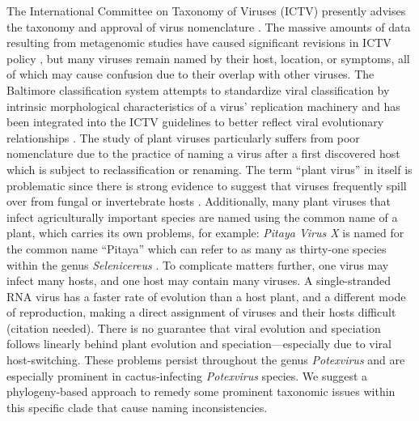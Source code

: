 \documentclass[11pt,letterpaper,titlepage]{article}
\begin{document}
\begin{linenumbers}
The International Committee on Taxonomy of Viruses (ICTV) presently advises the taxonomy and approval of virus nomenclature \citep{simmonds2017virus,lefkowitz2018virus,international2020new}.
The massive amounts of data resulting from metagenomic studies have caused significant revisions in ICTV policy \citep{international2020new,simmonds2017virus}, but many viruses remain named by their host, location, or symptoms, all of which may cause confusion due to their overlap with other viruses.
The Baltimore classification system attempts to standardize viral classification by intrinsic morphological characteristics of a virus' replication machinery and has been integrated into the ICTV guidelines to better reflect viral evolutionary relationships \citep{international2020new}.
The study of plant viruses particularly suffers from poor nomenclature due to the practice of naming a virus after a first discovered host which is subject to reclassification or renaming. 
The term ``plant virus'' in itself is problematic since there is strong evidence to suggest that viruses frequently spill over from fungal or invertebrate hosts \citep{lefeuvre_evolution_2019}.
Additionally, many plant viruses that infect agriculturally important species are named using the common name of a plant, which carries its own problems, for example: \textit{Pitaya Virus X} is named for the common name ``Pitaya'' which can refer to as many as thirty-one species within the genus \textit{Selenicereus} \citep{korotkova_phylogenetic_2017,guerrero_phylogenetic_2019,le_bellec_12_2011}.
To complicate matters further, one virus may infect many hosts, and one host may contain many viruses. 
A single-stranded RNA virus has a faster rate of evolution than a host plant, and a different mode of reproduction, making a direct assignment of viruses and their hosts difficult (citation needed).
There is no guarantee that viral evolution and speciation follows linearly behind plant evolution and speciation---especially due to viral host-switching.
These problems persist throughout the genus \textit{Potexvirus} and are especially prominent in cactus-infecting \textit{Potexvirus} species.
We suggest a phylogeny-based approach to remedy some prominent taxonomic issues within this specific clade that cause naming inconsistencies.



\end{linenumbers}
\end{document}
